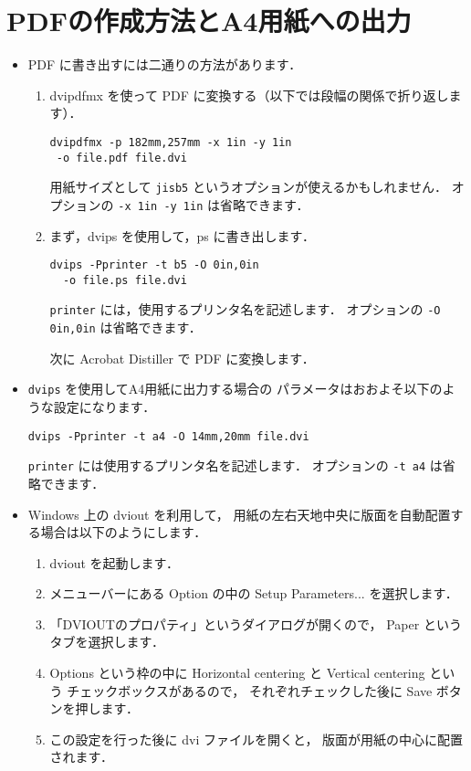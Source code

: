 \documentclass[paper]{ieicej}
\begin{document}
\appendix
\section{PDFの作成方法とA4用紙への出力}

\begin{itemize}
\item
PDF に書き出すには二通りの方法があります．
\begin{enumerate}
\item
dvipdfmx を使って PDF に変換する（以下では段幅の関係で折り返します）．
\begin{verbatim}
dvipdfmx -p 182mm,257mm -x 1in -y 1in
 -o file.pdf file.dvi
\end{verbatim}
用紙サイズとして \texttt{jisb5} というオプションが使えるかもしれません．
オプションの \texttt{-x 1in -y 1in} は省略できます．

\item
まず，dvips を使用して，ps に書き出します．
\begin{verbatim}
dvips -Pprinter -t b5 -O 0in,0in
  -o file.ps file.dvi
\end{verbatim}
\texttt{printer} には，使用するプリンタ名を記述します．
オプションの \texttt{-O 0in,0in} は省略できます．

次に Acrobat Distiller で PDF に変換します．
\end{enumerate}

\item
\texttt{dvips} を使用してA4用紙に出力する場合の
パラメータはおおよそ以下のような設定になります．
\begin{verbatim}
dvips -Pprinter -t a4 -O 14mm,20mm file.dvi
\end{verbatim}
\texttt{printer} には使用するプリンタ名を記述します．
オプションの \texttt{-t a4} は省略できます．

\item
Windows 上の dviout を利用して，
用紙の左右天地中央に版面を自動配置する場合は以下のようにします．
\begin{enumerate}
\item
dviout を起動します．
\item
メニューバーにある Option の中の Setup Parameters... を選択します．
\item
「DVIOUTのプロパティ」というダイアログが開くので，
Paper というタブを選択します．
\item
Options という枠の中に Horizontal centering と Vertical centering という
チェックボックスがあるので，
それぞれチェックした後に Save ボタンを押します．
\item
この設定を行った後に dvi ファイルを開くと，
版面が用紙の中心に配置されます．
\end{enumerate}
\end{itemize}
\end{document}
